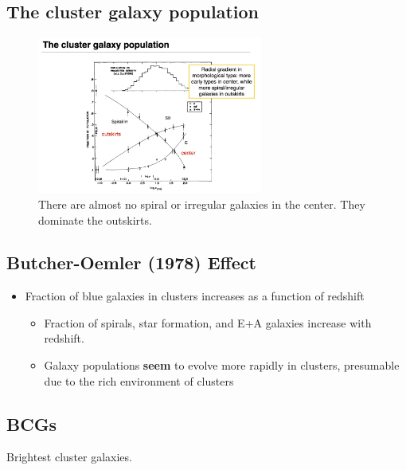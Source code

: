 \documentclass{article}
\begin{document}
\subsection{The cluster galaxy population}

\begin{figure}
    \centering
    \includegraphics[width=0.66\textwidth]{figs/Screen Shot 2021-10-29 at 10.45.09 AM.png}
    \caption{There are almost no spiral or irregular galaxies in the center. They dominate the outskirts. }
    \label{fig:pos_inclusters}
\end{figure}


\subsection{Butcher-Oemler (1978) Effect}

\begin{itemize}
    \item Fraction of blue galaxies in clusters increases as a function of redshift
    \begin{itemize}
        \item Fraction of spirals, star formation, and E+A galaxies increase with redshift.
        \item Galaxy populations \textbf{seem} to evolve more rapidly in clusters, presumable due to the rich environment of clusters
    \end{itemize}
\end{itemize}

\subsection{BCGs}

Brightest cluster galaxies.
\end{document}
